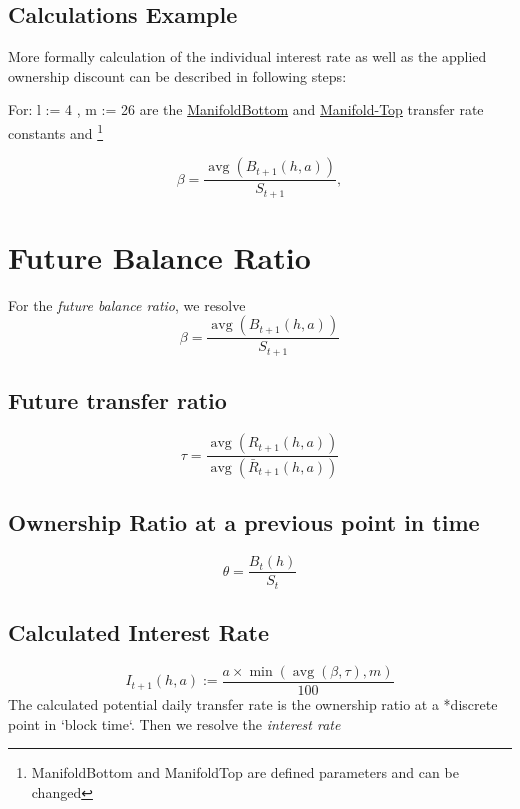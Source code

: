 \subsection{Calculations Example}
More formally calculation of the individual interest rate as well as the applied ownership discount can be described in following steps:

For: l := 4 , m := 26 are the \url{ManifoldBottom} and \url{Manifold-Top} transfer rate constants and \footnote{ManifoldBottom and ManifoldTop are defined parameters and can be changed}

\label{sec:Calculations}
\begin{equation}
\beta=\frac{\operatorname{avg}\left(B_{t+1}(h, a)\right)}{S_{t+1}}, 
\end{equation}
\newpage
\section{Future Balance Ratio}
For the \textit{future balance ratio}, we resolve
\label{sec:Calculations}
\begin{equation}
    \beta=\frac{\operatorname{avg}\left(B_{t+1}(h, a)\right)}{S_{t+1}}
\end{equation}
\label{future transfer ratio}
\subsection{Future transfer ratio}
\begin{equation}
    \tau=\frac{\operatorname{avg}\left(R_{t+1}(h, a)\right)}{\operatorname{avg}\left(\bar{R}_{t+1}(h, a)\right)}
\end{equation}

\subsection{Ownership Ratio at a previous point in time}
\begin{equation}
    \theta=\frac{B_{t}(h)}{S_{t}}
\end{equation}

\subsection{Calculated Interest Rate}
\begin{equation}
    I_{t+1}(h, a):=\frac{a \times \min (\operatorname{avg}(\beta, \tau), m)}{100}
\end{equation}
The calculated potential daily transfer rate  is the ownership ratio at a *discrete point in `block time`. Then we resolve the \textit{interest rate}

